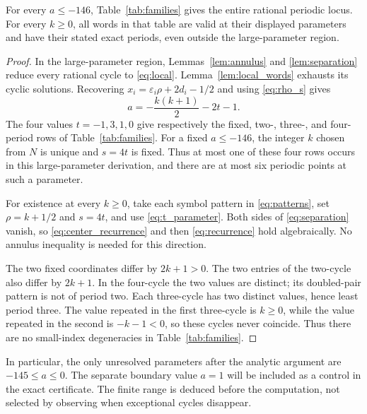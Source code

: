 \begin{proposition}
\label{prop:large_classification}
For every $a\le-146$, Table~\ref{tab:families} gives the entire
rational periodic locus. For every $k\ge0$, all words in that
table are valid at their displayed parameters and have their
stated exact periods, even outside the large-parameter region.
\end{proposition}
\begin{proof}
In the large-parameter region, Lemmas~\ref{lem:annulus} and
\ref{lem:separation} reduce every rational cycle to
\eqref{eq:local}. Lemma~\ref{lem:local_words} exhausts its cyclic
solutions. Recovering
$x_i=\varepsilon_i\rho+2d_i-1/2$ and using
\eqref{eq:rho_s} gives
\begin{equation}
 a=-\frac{k(k+1)}2-2t-1.
 \label{eq:t_parameter}
\end{equation}
The four values $t=-1,3,1,0$ give respectively the fixed,
two-, three-, and four-period rows of Table~\ref{tab:families}.
For a fixed $a\le-146$, the integer $k$ chosen from $N$ is unique
and $s=4t$ is fixed. Thus at most one of these four rows occurs
in this large-parameter derivation, and there are at most six
periodic points at such a parameter.

For existence at every $k\ge0$, take each symbol pattern in
\eqref{eq:patterns}, set $\rho=k+1/2$ and $s=4t$, and use
\eqref{eq:t_parameter}. Both sides of \eqref{eq:separation}
vanish, so \eqref{eq:center_recurrence} and then
\eqref{eq:recurrence} hold algebraically. No annulus inequality
is needed for this direction.

The two fixed coordinates differ by $2k+1>0$. The two entries
of the two-cycle also differ by $2k+1$.
In the four-cycle the two values are distinct; its doubled-pair
pattern is not of period two. Each three-cycle has two distinct
values, hence least period three. The value repeated in the
first three-cycle is $k\ge0$, while the value repeated in the
second is $-k-1<0$, so these cycles never coincide. Thus there
are no small-index degeneracies in Table~\ref{tab:families}.
\end{proof}

In particular, the only unresolved parameters after the analytic
argument are $-145\le a\le0$. The separate boundary value
$a=1$ will be included as a control in the exact certificate.
The finite range is deduced before the computation, not selected
by observing when exceptional cycles disappear.
